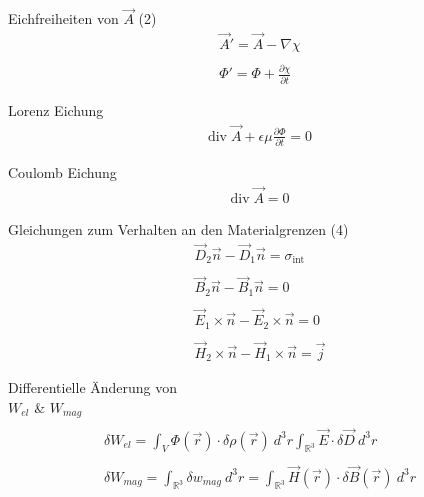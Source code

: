 \documentclass[a6paper]{kartei}
\renewcommand{\div}{\mathrm{div}\;}
\begin{document}
	
	
	\begin{karte}{Eichfreiheiten von $\vec A$ (2)}
		\begin{eqnarray*}
			\vec A' = \vec A - \nabla \chi \\\\
			\Phi' = \Phi + \frac{\partial \chi}{\partial t}
		\end{eqnarray*}
	\end{karte}
	
	
	\begin{karte}{Lorenz Eichung}
		\begin{eqnarray*}
			\div \vec A + \epsilon \mu \frac{\partial \Phi}{\partial t} = 0
		\end{eqnarray*}
	\end{karte}
	
	\begin{karte}{Coulomb Eichung}
		\begin{eqnarray*}
			\div \vec A = 0
		\end{eqnarray*}
	\end{karte}
	
	\begin{karte}[Potentialtheorie]{Gleichungen zum Verhalten an den Materialgrenzen (4)}
		\begin{eqnarray*}
			\vec D_2 \vec n - \vec D_1 \vec n = \sigma_{\text{int}} \\\\
			\vec B_2 \vec n - \vec B_1 \vec n = 0 \\\\
			\vec E_1 \times \vec n - \vec E_2 \times \vec n = 0 \\\\
			\vec H_2 \times \vec n - \vec H_1 \times \vec n = \vec j
		\end{eqnarray*}
	\end{karte}





%
	\begin{karte}{Differentielle Änderung von \\$W_{el}$ \&  $W_{mag}$}
	 \begin{eqnarray*}\\
	  \delta W_{el} = \int_{V} \Phi(\vec{r}) \cdot \delta \rho(\vec{r}) \ d^{3}r  \int_{\mathbb{R}^{3}} \vec{E} \cdot \delta \vec{D} \ d^{3}r    \\\\
 \delta W_{mag} = \int_{\mathbb{R}^3} \delta w_{mag} \ d^{3}r = \int_{\mathbb{R}^3} \vec{H}(\vec{r}) \cdot \delta \vec{B}(\vec{r}) \ d^{3}r
\end{eqnarray*}
	\end{karte}
 
\end{document}
